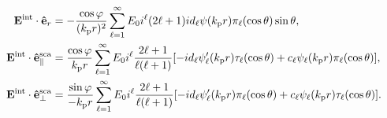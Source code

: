 \begin{subequations}\label{eq:Eint}%
\begin{align}
\vb{E}^\text{int}\cdot\vu{e}_r &=  -\frac{\cos\varphi}{(k_\text{p}r)^2}
               \sum_{\ell = 1}^\infty E_0i^\ell(2\ell+1)
               id_\ell \psi(k_\text{p}r)\pi_\ell(\cos\theta) \sin\theta ,
\label{eq:EintR}\\
\vb{E}^\text{int}\cdot\vu{e}^\text{sca}_\parallel &=  \frac{\cos\varphi}{k_\text{p}r}
               \sum_{\ell = 1}^\infty E_0i^\ell\frac{2\ell+1}{\ell(\ell+1)}
           [-i d_\ell\psi_\ell'(k_\text{p}r)\tau_\ell(\cos\theta)+c_\ell\psi_\ell(k_\text{p}r)\pi_\ell(\cos\theta)],
\label{eq:EintTheta}\\
\vb{E}^\text{int}\cdot\vu{e}^\text{sca}_\perp &=  \frac{\sin\varphi}{-k_\text{p}r}
               \sum_{\ell = 1}^\infty E_0i^\ell\frac{2\ell+1}{\ell(\ell+1)}
           [-i d_\ell\psi_\ell'(k_\text{p}r)\pi_\ell(\cos\theta)+c_\ell\psi_\ell(k_\text{p}r)\tau_\ell(\cos\theta)].
\label{eq:EintMPhi}
\end{align}%
\end{subequations}


